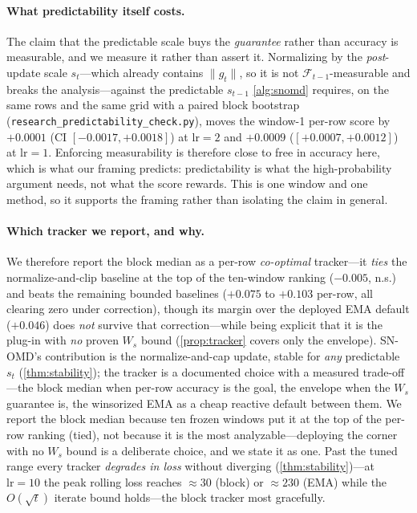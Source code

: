 \documentclass{article}
\newcommand{\norm}[1]{\lVert #1 \rVert}
\newcommand{\gt}{g_t}
\begin{document}
\paragraph{What predictability itself costs.} The claim that the predictable scale buys the
\emph{guarantee} rather than accuracy is measurable, and we measure it rather than assert it.
Normalizing by the \emph{post}-update scale $s_t$---which already contains $\norm{\gt}$, so it is
not $\mathcal F_{t-1}$-measurable and breaks the analysis---against the predictable $s_{t-1}$
\cref{alg:snomd} requires, on the same rows and the same grid with a paired block bootstrap
(\texttt{research\_predictability\_check.py}), moves the window-1 per-row score by
$+0.0001$ (CI $[-0.0017,+0.0018]$) at $\mathrm{lr}{=}2$ and $+0.0009$
($[+0.0007,+0.0012]$) at $\mathrm{lr}{=}1$. Enforcing measurability is therefore close to free
in accuracy here, which is what our framing predicts: predictability is what the
high-probability argument needs, not what the score rewards. This is one window and one method,
so it supports the framing rather than isolating the claim in general.

\paragraph{Which tracker we report, and why.} We therefore report the block median as a
per-row \emph{co-optimal} tracker---it \emph{ties} the normalize-and-clip baseline at the top of
the ten-window ranking ($-0.005$, n.s.) and beats the remaining bounded baselines
($+0.075$ to $+0.103$ per-row, all clearing zero under correction), though its margin over the
deployed EMA default ($+0.046$) does \emph{not} survive that correction---while
being explicit that it is the plug-in with \emph{no} proven $W_s$ bound (\cref{prop:tracker}
covers only the envelope). SN-OMD's contribution is the normalize-and-cap update, stable for
\emph{any} predictable $s_t$ (\cref{thm:stability}); the tracker is a documented choice with a
measured trade-off---the block median when per-row accuracy is the goal, the envelope when the
$W_s$ guarantee is, the winsorized EMA as a cheap reactive default between them. We report
the block median because ten frozen windows put it at the top of the per-row ranking (tied),
not because it is the most analyzable---deploying the corner with no $W_s$ bound is a deliberate
choice, and we state it as one. Past the tuned range every tracker
\emph{degrades in loss} without diverging (\cref{thm:stability})---at $\mathrm{lr}{=}10$ the
peak rolling loss reaches $\approx30$ (block) or $\approx230$ (EMA) while the $O(\sqrt t)$
iterate bound holds---the block tracker most gracefully.
\end{document}
